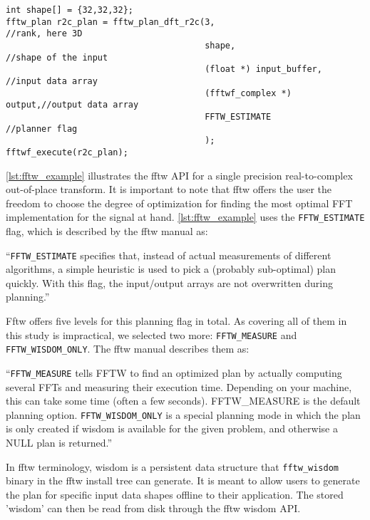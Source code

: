 \begin{lstlisting}[caption={Minimal usage example of the FFTW single precision real-to-complex planner API. Memory management is omitted.},label={lst:fftw_example}]
int shape[] = {32,32,32};
fftw_plan r2c_plan = fftw_plan_dft_r2c(3,                       //rank, here 3D 
                                       shape,                   //shape of the input
                                       (float *) input_buffer,  //input data array
                                       (fftwf_complex *) output,//output data array
                                       FFTW_ESTIMATE            //planner flag
                                       );
fftwf_execute(r2c_plan);
\end{lstlisting}

\cref{lst:fftw_example} illustrates the fftw API for a single precision real-to-complex out-of-place transform. It is important to note that fftw offers the user the freedom to choose the degree of optimization for finding the most optimal FFT implementation for the signal at hand. \cref{lst:fftw_example} uses the \texttt{FFTW\_ESTIMATE} flag, which is described by the fftw manual \cite{fftw_manual} as:

\begin{center}
  ``\texttt{FFTW\_ESTIMATE} specifies that, instead of actual measurements of different algorithms, a simple heuristic is used to pick a (probably sub-optimal) plan quickly. With this flag, the input/output arrays are not overwritten during planning.''
\end{center}

Fftw offers five levels for this planning flag in total. As covering all of them in this study is impractical, we selected two more: \texttt{FFTW\_MEASURE} and \texttt{FFTW\_WISDOM\_ONLY}. The fftw manual describes them as:

\begin{center}
  ``\texttt{FFTW\_MEASURE} tells FFTW to find an optimized plan by actually computing several FFTs and measuring their execution time. Depending on your machine, this can take some time (often a few seconds). FFTW\_MEASURE is the default planning option.\newline
  \texttt{FFTW\_WISDOM\_ONLY} is a special planning mode in which the plan is only created if wisdom is available for the given problem, and otherwise a NULL plan is returned.''
\end{center}

In fftw terminology, wisdom is a persistent data structure that \texttt{fftw\_wisdom} binary in the fftw install tree can generate. It is meant to allow users to generate the plan for specific input data shapes offline to their application. The stored 'wisdom' can then be read from disk through the fftw wisdom API. 

